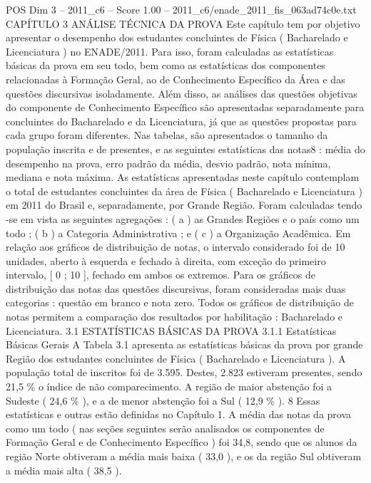 \begin{textsample}{POS Dim 3 – 2011\_c6 – Score 1.00 – 2011\_c6/enade\_2011\_fis\_063ad74c0e.txt}  \label{ex:f3_pos_209}
CAPÍTULO 3 ANÁLISE TÉCNICA DA PROVA Este capítulo tem por objetivo apresentar o desempenho dos estudantes concluintes de Física ( Bacharelado e Licenciatura ) no ENADE/2011.
Para isso, foram calculadas as estatísticas básicas da prova em seu todo, bem como as estatísticas dos componentes relacionadas à Formação Geral, ao de Conhecimento Específico da Área e das questões discursivas isoladamente.
Além disso, as análises das questões objetivas do componente de Conhecimento Específico são apresentadas separadamente para concluintes do Bacharelado e da Licenciatura, já que as questões propostas para cada grupo foram diferentes.
Nas tabelas, são apresentados o tamanho da população inscrita e de presentes, e as seguintes estatísticas das notas8 : média do desempenho na prova, erro padrão da média, desvio padrão, nota mínima, mediana e nota máxima.
As estatísticas apresentadas neste capítulo contemplam o total de estudantes concluintes da área de Física ( Bacharelado e Licenciatura ) em 2011 do Brasil e, separadamente, por Grande Região.
Foram calculadas tendo -se em vista as seguintes agregações : ( a ) as Grandes Regiões e o país como um todo ; ( b ) a Categoria Administrativa ; e ( c ) a Organização Acadêmica.
Em relação aos gráficos de distribuição de notas, o intervalo considerado foi de 10 unidades, aberto à esquerda e fechado à direita, com exceção do primeiro intervalo, [ 0 ; 10 ], fechado em ambos os extremos.
Para os gráficos de distribuição das notas das questões discursivas, foram consideradas mais duas categorias : questão em branco e nota zero.
Todos os gráficos de distribuição de notas permitem a comparação dos resultados por habilitação : Bacharelado e Licenciatura. 3.1 ESTATÍSTICAS BÁSICAS DA PROVA 3.1.1 Estatísticas Básicas Gerais A Tabela 3.1 apresenta as estatísticas básicas da prova por grande Região dos estudantes concluintes de Física ( Bacharelado e Licenciatura ).
A população total de inscritos foi de 3.595.
Destes, 2.823 estiveram presentes, sendo 21,5 \% o índice de não comparecimento.
A região de maior abstenção foi a Sudeste ( 24,6 \% ), e a de menor abstenção foi a Sul ( 12,9 \% ). 8 Essas estatísticas e outras estão definidas no Capítulo 1.
A média das notas da prova como um todo ( nas seções seguintes serão analisados os componentes de Formação Geral e de Conhecimento Específico ) foi 34,8, sendo que os alunos da região Norte obtiveram a média mais baixa ( 33,0 ), e os da região Sul obtiveram a média mais alta ( 38,5 ).

\end{textsample}
